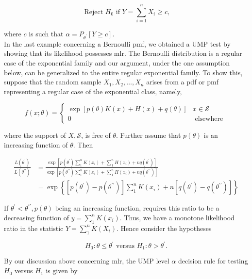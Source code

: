$$
\text { Reject } H_{0} \text { if } Y=\sum_{i=1}^{n} X_{i} \geq c,
$$

where $c$ is such that $\alpha=P_{\theta^{\prime}}[Y \geq c]$.\\
In the last example concerning a Bernoulli pmf, we obtained a UMP test by showing that its likelihood possesses mlr. The Bernoulli distribution is a regular case of the exponential family and our argument, under the one assumption below, can be generalized to the entire regular exponential family. To show this, suppose that the random sample $X_{1}, X_{2}, \ldots, X_{n}$ arises from a pdf or pmf representing a regular case of the exponential class, namely,

$$
f(x ; \theta)= \begin{cases}\exp [p(\theta) K(x)+H(x)+q(\theta)] & x \in \mathcal{S} \\ 0 & \text { elsewhere }\end{cases}
$$

where the support of $X, \mathcal{S}$, is free of $\theta$. Further assume that $p(\theta)$ is an increasing function of $\theta$. Then

$$
\begin{aligned}
\frac{L\left(\theta^{\prime}\right)}{L\left(\theta^{\prime \prime}\right)} & =\frac{\exp \left[p\left(\theta^{\prime}\right) \sum_{1}^{n} K\left(x_{i}\right)+\sum_{1}^{n} H\left(x_{i}\right)+n q\left(\theta^{\prime}\right)\right]}{\exp \left[p\left(\theta^{\prime \prime}\right) \sum_{1}^{n} K\left(x_{i}\right)+\sum_{1}^{n} H\left(x_{i}\right)+n q\left(\theta^{\prime \prime}\right)\right]} \\
& =\exp \left\{\left[p\left(\theta^{\prime}\right)-p\left(\theta^{\prime \prime}\right)\right] \sum_{1}^{n} K\left(x_{i}\right)+n\left[q\left(\theta^{\prime}\right)-q\left(\theta^{\prime \prime}\right)\right]\right\}
\end{aligned}
$$

If $\theta^{\prime}<\theta^{\prime \prime}, p(\theta)$ being an increasing function, requires this ratio to be a decreasing function of $y=\sum_{1}^{n} K\left(x_{i}\right)$. Thus, we have a monotone likelihood ratio in the statistic $Y=\sum_{1}^{n} K\left(X_{i}\right)$. Hence consider the hypotheses


\begin{equation*}
H_{0}: \theta \leq \theta^{\prime} \text { versus } H_{1}: \theta>\theta^{\prime} . \tag{8.2.5}
\end{equation*}


By our discussion above concerning mlr, the UMP level $\alpha$ decision rule for testing $H_{0}$ versus $H_{1}$ is given by


